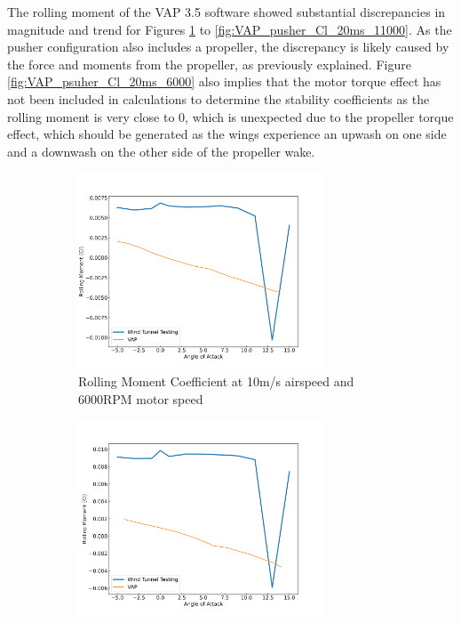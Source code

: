 The rolling moment of the VAP 3.5 software showed substantial discrepancies in magnitude and trend for Figures \ref{fig:VAP_pusher_Cl_10ms_6000} to \ref{fig:VAP_pusher_Cl_20ms_11000}. As the pusher configuration also includes a propeller, the discrepancy is likely caused by the force and moments from the propeller, as previously explained. Figure \ref{fig:VAP_psuher_Cl_20ms_6000} also implies that the motor torque effect has not been included in calculations to determine the stability coefficients as the rolling moment is very close to 0, which is unexpected due to the propeller torque effect, which should be generated as the wings experience an upwash on one side and a downwash on the other side of the propeller wake.

\begin{figure}[H]
    \centering
    \begin{subfigure}[b]{0.467\textwidth}
        \centering
        \includegraphics[width=0.8\textwidth]{05_Results/VAP/pusher/Cl/10ms_6000RPM_Cl.png}
        \caption{Rolling Moment Coefficient at 10m/s airspeed and 6000RPM motor speed}
        \label{fig:VAP_pusher_Cl_10ms_6000}
    \end{subfigure}
    \begin{subfigure}[b]{0.467\textwidth}
        \centering
        \includegraphics[width=0.8\textwidth]{05_Results/VAP/pusher/Cl/10ms_11000RPM_Cl.png}

\end{subfigure}
\end{figure}
